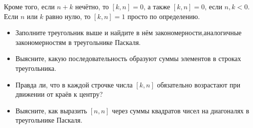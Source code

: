 Кроме того, если $n+k$ нечётно, то $[k,n] = 0$, а также $[k,n] = 0$, если $n,k < 0$. Если $n$ или $k$ равно нулю, то $[k,n] = 1$ просто по определению.
\begin{itemize}
\item Заполните треугольник выше и найдите в нём закономерности,\linebreak аналогичные закономерностям в треугольнике Паскаля.
\item Выясните, какую последовательность образуют суммы элементов в строках треугольника.
\item Правда ли, что в каждой строчке числа $[k,n]$ обязательно возрастают при движении от краёв к центру?
\item Выясните, как выразить $[n,n]$ через суммы квадратов чисел на диагоналях в треугольнике Паскаля.
\end{itemize}